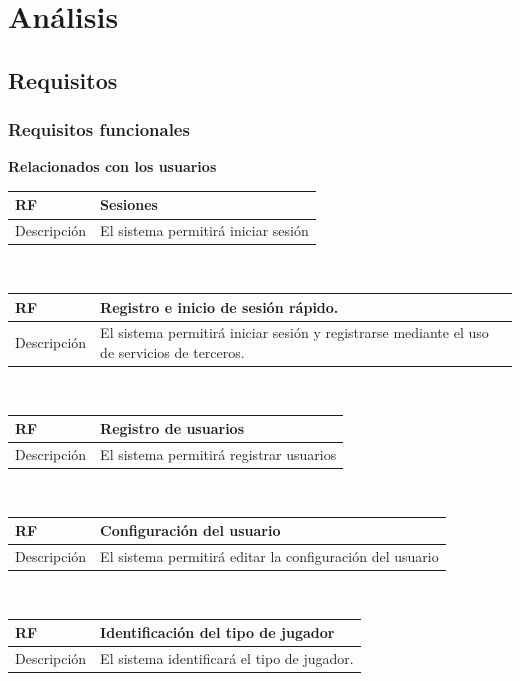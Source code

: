 \documentclass[twoside]{report}
\newcommand\addrow[2]{#1 &#2\\ }
\newcommand\addheading[2]{#1 &#2\\ \hline}
\newcommand\tabularhead{\begin{tabular}{lp{0.7\textwidth}}
\hline
}
\newenvironment{req}{\tabularhead}
{\hline\end{tabular}}
\begin{document}
\section{Análisis}
\subsection{Requisitos}

\subsubsection{Requisitos funcionales}

\textbf{Relacionados con los usuarios}\\

\begin{req}
	\addheading{\textbf{RF\arabic{functionalRequirements}}}{Sesiones}
	\addrow{Descripción}{El sistema permitirá iniciar sesión}
\end{req} \\
 
\begin{req}
	\addheading{\textbf{RF\arabic{functionalRequirements}}}{Registro e inicio de sesión rápido.}
	\addrow{Descripción}{El sistema permitirá iniciar sesión y registrarse mediante el uso de servicios de terceros.}
\end{req} \\

\begin{req}
	\addheading{\textbf{RF\arabic{functionalRequirements}}}{Registro de usuarios}
	\addrow{Descripción}{El sistema permitirá registrar usuarios}
\end{req}\\

\begin{req}
	\addheading{\textbf{RF\arabic{functionalRequirements}}}{Configuración del usuario}
	\addrow{Descripción}{El sistema permitirá editar la configuración del usuario}
\end{req}\\

\begin{req}
	\addheading{\textbf{RF\arabic{functionalRequirements}}}{Identificación del tipo de jugador}
	\addrow{Descripción}{El sistema identificará el tipo de jugador.}
\end{req}\\
\end{document}
